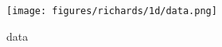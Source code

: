 \begin{figure}[ht]
\begin{center}
\texttt{[image: figures/richards/1d/data.png]}
\end{center}
\caption{
    data
}
\label{fig:richards-1d-data}
\end{figure}
